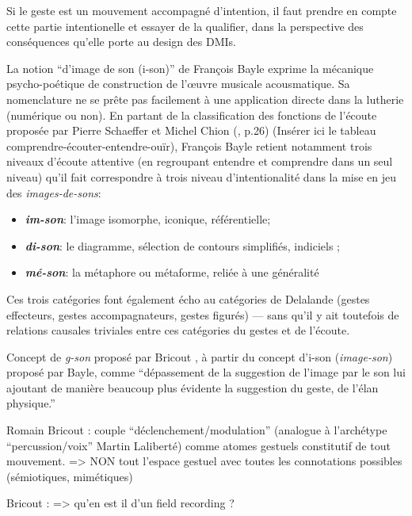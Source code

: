 Si le geste est un mouvement accompagné d'intention, il faut prendre en compte cette partie intentionelle et essayer de la qualifier, dans la perspective des conséquences qu'elle porte au design des \glspl{DMI}.

La notion ``d'image de son (i-son)'' de François Bayle exprime la mécanique psycho-poétique de construction de l'œuvre musicale acousmatique. Sa nomenclature ne se prête pas facilement à une application directe dans la lutherie (numérique ou non).
En partant de la classification des fonctions de l'écoute proposée par Pierre Schaeffer et Michel Chion (\cite{chion_guide_1994}, p.26) (Insérer ici le tableau comprendre-écouter-entendre-ouïr), François Bayle retient notamment trois niveaux d'écoute attentive (en regroupant entendre et comprendre dans un seul niveau) qu'il fait correspondre à trois niveau d'intentionalité dans la mise en jeu des \textit{images-de-sons}:
\vspace{-1em}
\begin{itemize}[noitemsep]
\item \textbf{\textit{im-son}}: l'image isomorphe, iconique, référentielle;
\item \textbf{\textit{di-son}}: le diagramme, sélection de contours simplifiés, indiciels ;
\item \textbf{\textit{mé-son}}: la métaphore ou métaforme, reliée à une généralité
\end{itemize}

Ces trois catégories font également écho au catégories de Delalande (gestes effecteurs, gestes accompagnateurs, gestes figurés) — sans qu'il y ait toutefois de relations causales triviales entre ces catégories du gestes et de l'écoute.

Concept de \textit{g-son} proposé par Bricout \cite{bricout_les_2011}, à partir du concept d'i-son (\textit{image-son}) proposé par Bayle, comme ``dépassement de la suggestion de l'image par le son lui ajoutant de manière beaucoup plus évidente la suggestion du geste, de l'élan physique.''

Romain Bricout : couple ``déclenchement/modulation'' (analogue à l'archétype ``percussion/voix'' Martin Laliberté) comme atomes gestuels constitutif de tout mouvement. => NON tout l'espace gestuel avec toutes les connotations possibles (sémiotiques, mimétiques)

Bricout :
=> qu'en est il d'un field recording ?

